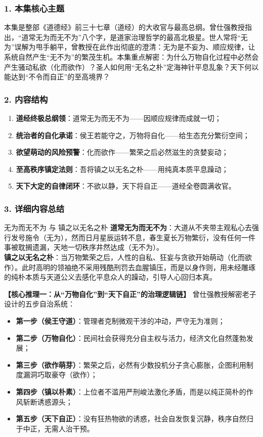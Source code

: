 \subsubsection{1. 本集核心主题}
本集是整部《道德经》前三十七章（道经）的大收官与最高总纲。曾仕强教授指出，“道常无为而无不为”八个字，是道家治理哲学的最高北极星。世人常将“无为”误解为甩手躺平，曾教授在此作出彻底的澄清：无为是不妄为、顺应规律，让系统自然产生“无不为”的繁茂生机。本集重点解密：为什么万物自化过程中必然会产生骚动私欲（化而欲作）？圣人如何用“无名之朴”定海神针平息乱象？天下何以能达到“不令而自正”的至高境界？

\subsubsection{2. 内容结构}
\begin{enumerate}
    \item \textbf{道经终极总纲领}：道常无为而无不为——因顺应规律而成就一切；
    \item \textbf{统治者的自化承诺}：侯王若能守之，万物将自化——给生态充分繁衍空间；
    \item \textbf{欲望萌动的风险预警}：化而欲作——繁荣之后必然滋生的贪婪妄动；
    \item \textbf{至高秩序镇定法则}：吾将镇之以无名之朴——用纯真本质平息躁动；
    \item \textbf{天下大定的自律闭环}：不欲以静，天下将自正——道经全卷圆满收官。
\end{enumerate}

\subsubsection{3. 详细内容总结}

\begin{ConceptBox}{无为而无不为 与 镇之以无名之朴}
\textbf{道常无为而无不为}：大道从不夹带主观私心去强行发号施令（无为），然而日月星辰运转不息，春生夏长万物繁衍，没有任何一件事被耽搁遗漏，天地一切秩序井然达成（无不为）。\\
\textbf{镇之以无名之朴}：当万物繁荣之后，人性的自私、狂妄与贪欲开始萌动（化而欲作）。此时高明的领袖绝不采用残酷刑罚去血腥镇压，而是以身作则，用未经雕琢的纯朴本质与天道公义去感化平息众人的躁动，引导人心回归本真。
\end{ConceptBox}

\noindent\textbf{【核心推理一：从“万物自化”到“天下自正”的治理逻辑链】}
曾仕强教授解密老子设计的五步自治系统：
\begin{itemize}
    \item \textbf{第一步（侯王守道）}：管理者克制微观干涉的冲动，严守无为准则；
    \item \textbf{第二步（万物自化）}：民间社会获得充分自主权与活力，经济文化自然蓬勃发展；
    \item \textbf{第三步（欲作萌芽）}：繁荣之后，必然有少数投机分子贪心膨胀，企图利用制度漏洞巧取豪夺（欲作）；
    \item \textbf{第四步（镇以朴素）}：上位者不滥用严刑峻法激化矛盾，而是以纯正简朴的作风斩断诱惑源头；
    \item \textbf{第五步（天下自正）}：没有狂热物欲的诱惑，社会自发恢复沉静，秩序自然归于中正，无需人治干预。
\end{itemize}

